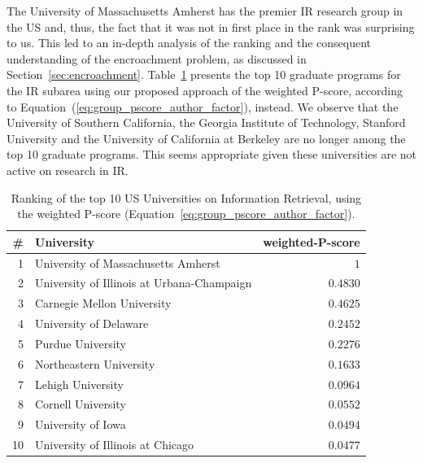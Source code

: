 \documentclass[msc]{ppgccufmg}
\begin{document}
The University of Massachusetts Amherst has the premier IR research group in the US and, thus, the fact that it was not in first place in the rank was surprising to us. This led to an in-depth analysis of the ranking and the consequent understanding of the encroachment problem, as discussed in Section~\ref{sec:encroachment}. 
%
Table~\ref{tab:top10-ir} presents the top 10 graduate programs for the IR subarea using our proposed approach of the weighted P-score, according to Equation~(\ref{eq:group_pscore_author_factor}), instead. We observe that the University of Southern California, the Georgia Institute of Technology, Stanford University and the University of California at Berkeley are no longer among the top 10 graduate programs. This seems appropriate given these universities are not active on research in IR.

\begin{table}[htbp]
\centering
\caption{Ranking of the top 10 US Universities on Information Retrieval, using the weighted P-score (Equation~\ref{eq:group_pscore_author_factor}).}
\label{tab:top10-ir}
\begin{tabular}{rlr}
    \toprule
    \# & University                                 & \multicolumn{1}{c}{weighted-P-score} \\
    \midrule
    1  & University of Massachusetts Amherst        & $1$                         \\
    2  & University of Illinois at Urbana-Champaign & $0.4830$                    \\
    3  & Carnegie Mellon University                 & $0.4625$                    \\
    4  & University of Delaware                     & $0.2452$                    \\
    5  & Purdue University                          & $0.2276$                    \\
    6  & Northeastern University                    & $0.1633$                    \\
    7  & Lehigh University                          & $0.0964$                    \\
    8  & Cornell University                         & $0.0552$                    \\
    9  & University of Iowa                         & $0.0494$                    \\
    10 & University of Illinois at Chicago          & $0.0477$                    \\
    \bottomrule
\end{tabular}
\end{table}
\end{document}
